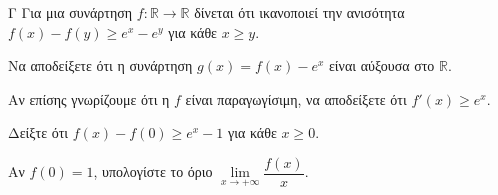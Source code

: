 \begin{thema}{Γ}
Για μια συνάρτηση $f: \mathbb{R} \to \mathbb{R}$ δίνεται ότι ικανοποιεί την ανισότητα $f(x) - f(y) \ge e^x - e^y$ για κάθε $x \ge y$. 
\begin{erwthma}
  \item Να αποδείξετε ότι η συνάρτηση $g(x) = f(x) - e^x$ είναι αύξουσα στο $\mathbb{R}$.
  \item Αν επίσης γνωρίζουμε ότι η $f$ είναι παραγωγίσιμη, να αποδείξετε ότι $f'(x) \ge e^x$.
  \item Δείξτε ότι $f(x) - f(0) \ge e^x - 1$ για κάθε $x\geq 0$.
  \item Αν $f(0) = 1$, υπολογίστε το όριο $\lim\limits_{x \to +\infty} \dfrac{f(x)}{x}$.
\end{erwthma}
\end{thema}
